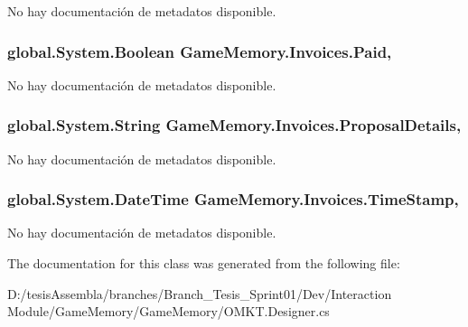 No hay documentación de metadatos disponible. 

\hypertarget{class_game_memory_1_1_invoices_a494ac26836e51198ef21d28dbe0c63e4}{
\subsubsection[{Paid}]{\setlength{\rightskip}{0pt plus 5cm}global.\-System.\-Boolean Game\-Memory.\-Invoices.\-Paid\hspace{0.3cm}{\ttfamily [get]}, {\ttfamily [set]}}}\label{class_game_memory_1_1_invoices_a494ac26836e51198ef21d28dbe0c63e4}


No hay documentación de metadatos disponible. 

\hypertarget{class_game_memory_1_1_invoices_a381a2b51810c12b0c4c5e7603c0ae942}{
\subsubsection[{Proposal\-Details}]{\setlength{\rightskip}{0pt plus 5cm}global.\-System.\-String Game\-Memory.\-Invoices.\-Proposal\-Details\hspace{0.3cm}{\ttfamily [get]}, {\ttfamily [set]}}}\label{class_game_memory_1_1_invoices_a381a2b51810c12b0c4c5e7603c0ae942}


No hay documentación de metadatos disponible. 

\hypertarget{class_game_memory_1_1_invoices_af2fd7641a9681d57e3aa2583bc90b458}{
\subsubsection[{Time\-Stamp}]{\setlength{\rightskip}{0pt plus 5cm}global.\-System.\-Date\-Time Game\-Memory.\-Invoices.\-Time\-Stamp\hspace{0.3cm}{\ttfamily [get]}, {\ttfamily [set]}}}\label{class_game_memory_1_1_invoices_af2fd7641a9681d57e3aa2583bc90b458}


No hay documentación de metadatos disponible. 



The documentation for this class was generated from the following file\-:\begin{DoxyCompactItemize}
\item 
D\-:/tesis\-Assembla/branches/\-Branch\-\_\-\-Tesis\-\_\-\-Sprint01/\-Dev/\-Interaction Module/\-Game\-Memory/\-Game\-Memory/O\-M\-K\-T.\-Designer.\-cs\end{DoxyCompactItemize}
